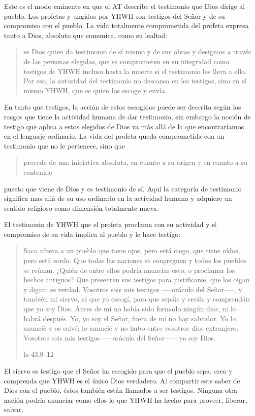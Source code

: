 Este es el modo eminente en que el AT describe el testimonio que Dios dirige al pueblo. Los profetas y ungidos por YHWH son testigos del Señor y de su compromiso con el pueblo. La vida totalmente comprometida del profeta expresa tanto a Dios, absoluto que comunica, como su lealtad: \blockquote[{\cite[116s]{prades2015testimonio}}]{es Dios quien da testimonio de sí mismo y de sus obras y designios a través de las personas elegidas, que se comprometen en su integridad como testigos de YHWH incluso hasta la muerte si el testimonio les lleva a ello. Por eso, la autoridad del testimonio no descansa en los testigos, sino en el mismo YHWH, que es quien los escoge y envía.} En tanto que testigos, la acción de estos escogidos puede ser descrita según los rasgos que tiene la actividad humana de dar testimonio, sin embargo la noción de testigo que aplica a estos elegidos de Dios va más allá de la que encontraríamos en el lenguaje ordinario. La vida del profeta queda comprometida con un testimonio que no le pertenece, sino que \blockquote[{\cite[118]{prades2015testimonio}}]{procede de una iniciativa absoluta, en cuanto a su origen y en cuanto a su contenido} puesto que viene de Dios y es testimonio de sí. Aquí la categoría de testimonio significa mas allá de su uso ordinario en la actividad humana y adquiere un sentido religioso como dimensión totalmente nueva\autocite[Cf.][118]{prades2015testimonio}.

El testimonio de YHWH que el profeta proclama con su actividad y el compromiso de su vida implica al pueblo y le hace testigo: \blockquote[{Is 43,8--12}]{Saca afuera a un pueblo que tiene ojos, pero está ciego, que tiene oídos, pero está sordo. Que todas las naciones se congreguen y todos los pueblos se reúnan. ¿Quién de entre ellos podría anunciar esto, o proclamar los hechos antiguos? Que presenten sus testigos para justificarse, que los oigan y digan: es verdad. Vosotros sois mis testigos --—oráculo del Señor--—, y también mi siervo, al que yo escogí, para que sepáis y creáis y comprendáis que yo soy Dios. Antes de mí no había sido formado ningún dios, ni lo habrá después. Yo, yo soy el Señor, fuera de mí no hay salvador. Yo lo anuncié y os salvé; lo anuncié y no hubo entre vosotros dios extranjero. Vosotros sois mis testigos --—oráculo del Señor--—: yo soy Dios.} El siervo es testigo que el Señor ha escogido para que el pueblo sepa, crea y comprenda que YHWH es el único Dios verdadero. Al compartir este saber de Dios con el pueblo, éstos también están llamados a ser testigos. Ninguna otra nación podría anunciar como ellos lo que YHWH ha hecho para proveer, liberar, salvar.

